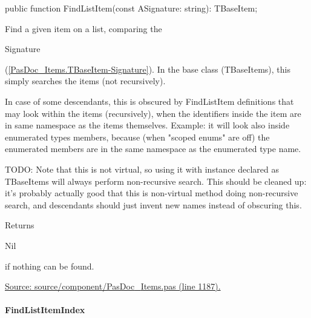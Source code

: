 \documentclass{report}
\newif\ifpdf
\begin{document}
\label{PasDoc_Items.TBaseItems-FindListItem}
\begin{list}{}{
\setlength{\itemindent}{0cm}
\setlength{\listparindent}{0cm}
\setlength{\leftmargin}{\evensidemargin}
\addtolength{\leftmargin}{\tmplength}
\settowidth{\labelsep}{X}
\addtolength{\leftmargin}{\labelsep}
\setlength{\labelwidth}{\tmplength}
}
\item[\textbf{Declaration}\hfill]
\ifpdf
\begin{flushleft}
\fi
\begin{ttfamily}
public function FindListItem(const ASignature: string): TBaseItem;\end{ttfamily}

\ifpdf
\end{flushleft}
\fi

\par
\item[\textbf{Description}]
Find a given item on a list, comparing the \begin{ttfamily}Signature\end{ttfamily}(\ref{PasDoc_Items.TBaseItem-Signature}). In the base class (TBaseItems), this simply searches the items (not recursively).

In case of some descendants, this is obscured by FindListItem definitions that may look within the items (recursively), when the identifiers inside the item are in same namespace as the items themselves. Example: it will look also inside enumerated types members, because (when "scoped enums" are off) the enumerated members are in the same namespace as the enumerated type name.

TODO: Note that this is not virtual, so using it with instance declared as TBaseItems will always perform non{-}recursive search. This should be cleaned up: it's probably actually good that this is non{-}virtual method doing non{-}recursive search, and descendants should just invent new names instead of obscuring this.

Returns \begin{ttfamily}Nil\end{ttfamily} if nothing can be found.\par
\href{https://github.com/pasdoc/pasdoc/blob/master/source/component/PasDoc_Items.pas#L1187}{Source: source/component/PasDoc{\_}Items.pas (line 1187).}

\end{list}
\paragraph*{FindListItemIndex}\hspace*{\fill}
\end{document}
